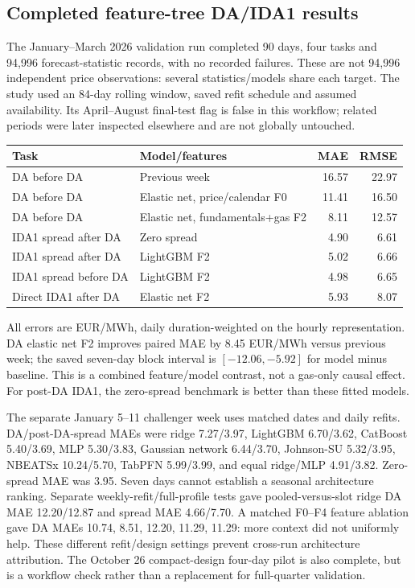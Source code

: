 \subsection{Completed feature-tree DA/IDA1 results}
The January--March 2026 validation run
 completed 90 days, four tasks and 94,996
forecast-statistic records, with no recorded failures. These are not 94,996
independent price observations: several statistics/models share each target.
The study used an 84-day rolling window, saved refit schedule and assumed
availability. Its April--August final-test flag is false in this workflow;
related periods were later inspected elsewhere and are not globally untouched.
\begin{center}\small
\begin{tabular}{llrr}
\toprule Task & Model/features & MAE & RMSE\\\midrule
DA before DA & Previous week & 16.57 & 22.97\\
DA before DA & Elastic net, price/calendar F0 & 11.41 & 16.50\\
DA before DA & Elastic net, fundamentals+gas F2 & 8.11 & 12.57\\
IDA1 spread after DA & Zero spread & 4.90 & 6.61\\
IDA1 spread after DA & LightGBM F2 & 5.02 & 6.66\\
IDA1 spread before DA & LightGBM F2 & 4.98 & 6.65\\
Direct IDA1 after DA & Elastic net F2 & 5.93 & 8.07\\
\bottomrule\end{tabular}\end{center}
All errors are EUR/MWh, daily duration-weighted on the hourly representation.
DA elastic net F2 improves paired MAE by 8.45 EUR/MWh versus previous week;
the saved seven-day block interval is $[-12.06,-5.92]$ for model minus baseline.
This is a combined feature/model contrast, not a gas-only causal effect.
For post-DA IDA1, the zero-spread benchmark is better than these fitted models.

The separate January 5--11 challenger week uses matched dates and daily refits.
DA/post-DA-spread MAEs were ridge 7.27/3.97, LightGBM 6.70/3.62, CatBoost
5.40/3.69, MLP 5.30/3.83, Gaussian network 6.44/3.70, Johnson-SU 5.32/3.95,
NBEATSx 10.24/5.70, TabPFN 5.99/3.99, and equal ridge/MLP 4.91/3.82.
Zero-spread MAE was 3.95. Seven days cannot establish a seasonal architecture
ranking. Separate weekly-refit/full-profile tests gave pooled-versus-slot ridge
DA MAE 12.20/12.87 and spread MAE 4.66/7.70. A matched F0--F4 feature ablation
gave DA MAEs 10.74, 8.51, 12.20, 11.29, 11.29: more context did not uniformly
help. These different refit/design settings prevent cross-run architecture
attribution. The October 26 compact-design four-day pilot is also complete,
but is a workflow check rather than a replacement for full-quarter validation.

